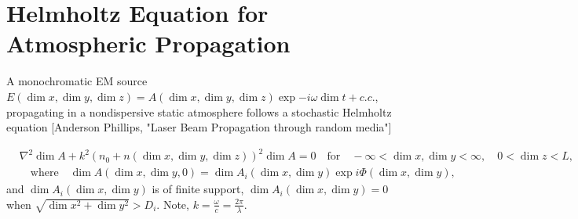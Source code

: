 
\section{Helmholtz Equation for Atmospheric Propagation}

A monochromatic EM source $E(\dim{x},\dim{y},\dim{z}) = A(\dim{x},\dim{y},\dim{z})\exp{-i\omega \dim{t}} + c.c.$, 
propagating in a nondispersive static atmosphere follows a stochastic Helmholtz equation  [Anderson Phillips, "Laser Beam Propagation through random media"]

\begin{equation}\label{EQ:helmholtz_equation_1}
\begin{split}
  &\nabla^2 \dim{A} + k^2  (n_0 +  n(\dim{x},\dim{y},\dim{z}))^2 \dim{A} = 0 \quad  \mbox{for}   
  \quad -\infty < \dim{x},\dim{y} < \infty, \quad 0 < \dim{z} < L, \\
  &\quad  \mbox{where} \quad \dim{A}(\dim{x},\dim{y},0) = \dim{A}_{i}(\dim{x},\dim{y})\exp{i \Phi(\dim{x},\dim{y})},
\end{split}
\end{equation}
and $\dim{A}_{i}(\dim{x},\dim{y})$ is of finite support, \ie $\dim{A}_{i}(\dim{x},\dim{y}) = 0$ 
when $\sqrt{\dim{x}^2 + \dim{y}^2} > D_{i}$. Note, $k = \frac{\omega}{c} = \frac{2\pi}{\lambda}$.  


